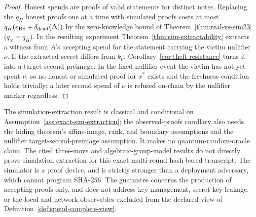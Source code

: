 \begin{proof}
Honest spends are proofs of valid statements for distinct notes.  Replacing the
\(q_H\) honest proofs one at a time with simulated proofs costs at most
\(q_H(\varepsilon_{\rm RS}+\delta_{\rm dead}(\Delta))\) by the zero-knowledge bound of
Theorem~\ref{thm:real-vs-sim23} (\(q_S=q_H\)).  In the resulting experiment
Theorem~\ref{thm:sim-extractability} extracts a witness from \(A\)'s accepting
spend for the statement carrying the victim nullifier \(\nu\).  If the
extracted secret differs from \(k_\nu\), Corollary~\ref{cor:theft-resistance}
turns it into a target second preimage.  In the fixed-nullifier event the victim
has not yet spent \(\nu\), so no honest or simulated proof for \(x^\ast\) exists and the
freshness condition holds trivially; a later second spend of \(\nu\) is refused
on-chain by the nullifier marker regardless.
\end{proof}

\begin{remark}[Scope]
\label{rem:sim-extractability}
The simulation-extraction result is classical and conditional on
Assumption~\ref{ass:exact-sim-extraction}; the observed-proofs corollary also
needs the hiding theorem's affine-image, rank, and boundary assumptions and
the nullifier target-second-preimage assumption.  It makes no
quantum-random-oracle claim.  The cited three-move and algebraic-group-model
results do not directly prove simulation extraction for this exact
multi-round hash-based transcript.  The simulator is a proof device, and is
strictly stronger than a deployment adversary, which cannot program SHA-256.
The guarantee concerns the production
of accepting proofs only, and does not address key management, secret-key
leakage, or the local and network observables excluded from the declared view
of Definition~\ref{def:spend-complete-view}.
\end{remark}
